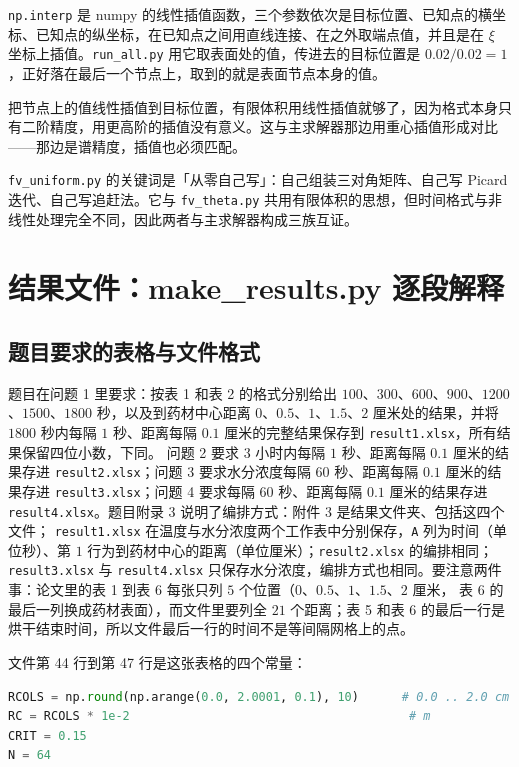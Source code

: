 \texttt{np.interp} 是 numpy 的线性插值函数，三个参数依次是目标位置、已知点的横坐标、已知点的纵坐标，在已知点之间用直线连接、在之外取端点值，并且是在 $\xi$ 坐标上插值。\texttt{run\_all.py} 用它取表面处的值，传进去的目标位置是 $0.02/0.02=1$，正好落在最后一个节点上，取到的就是表面节点本身的值。

把节点上的值线性插值到目标位置，有限体积用线性插值就够了，因为格式本身只有二阶精度，用更高阶的插值没有意义。这与主求解器那边用重心插值形成对比——那边是谱精度，插值也必须匹配。

\keypoint
\texttt{fv\_uniform.py} 的关键词是「从零自己写」：自己组装三对角矩阵、自己写 Picard 迭代、自己写追赶法。它与 \texttt{fv\_theta.py} 共用有限体积的思想，但时间格式与非线性处理完全不同，因此两者与主求解器构成三族互证。

\section{结果文件：make\_results.py 逐段解释}

\subsection{题目要求的表格与文件格式}

题目在问题 1 里要求：按表 1 和表 2 的格式分别给出 $100$、$300$、$600$、$900$、$1200$、$1500$、$1800$ 秒，以及到药材中心距离 $0$、$0.5$、$1$、$1.5$、$2$ 厘米处的结果，并将 $1800$ 秒内每隔 $1$ 秒、距离每隔 $0.1$ 厘米的完整结果保存到 \texttt{result1.xlsx}，所有结果保留四位小数，下同。
问题 2 要求 $3$ 小时内每隔 $1$ 秒、距离每隔 $0.1$ 厘米的结果存进 \texttt{result2.xlsx}；问题 3 要求水分浓度每隔 $60$ 秒、距离每隔 $0.1$ 厘米的结果存进 \texttt{result3.xlsx}；问题 4 要求每隔 $60$ 秒、距离每隔 $0.1$ 厘米的结果存进 \texttt{result4.xlsx}。题目附录 3 说明了编排方式：附件 3 是结果文件夹、包括这四个文件；
\texttt{result1.xlsx} 在温度与水分浓度两个工作表中分别保存，\texttt{A} 列为时间（单位秒）、第 $1$ 行为到药材中心的距离（单位厘米）；\texttt{result2.xlsx} 的编排相同；\texttt{result3.xlsx} 与 \texttt{result4.xlsx} 只保存水分浓度，编排方式也相同。要注意两件事：论文里的表 1 到表 6 每张只列 $5$ 个位置（$0$、$0.5$、$1$、$1.5$、$2$ 厘米，
表 6 的最后一列换成药材表面），而文件里要列全 $21$ 个距离；表 5 和表 6 的最后一行是烘干结束时间，所以文件最后一行的时间不是等间隔网格上的点。

文件第 44 行到第 47 行是这张表格的四个常量：

\begin{lstlisting}[language=Python]
RCOLS = np.round(np.arange(0.0, 2.0001, 0.1), 10)      # 0.0 .. 2.0 cm
RC = RCOLS * 1e-2                                       # m
CRIT = 0.15
N = 64
\end{lstlisting}


